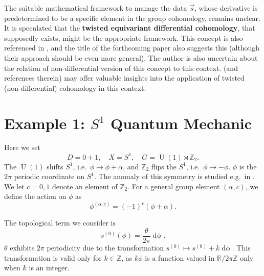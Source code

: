 \documentclass[
  letterpaper,
  DIV=11,
  numbers=noendperiod]{scrreport}
\DeclareMathOperator{\U}{U}
\begin{document}
\begin{tcolorbox}[enhanced jigsaw, opacityback=0, opacitybacktitle=0.6, leftrule=.75mm, arc=.35mm, coltitle=black, breakable, colframe=quarto-callout-note-color-frame, titlerule=0mm, colback=white, bottomrule=.15mm, left=2mm, colbacktitle=quarto-callout-note-color!10!white, toptitle=1mm, bottomtitle=1mm, title=\textcolor{quarto-callout-note-color}{\faInfo}\hspace{0.5em}{Twisted Equivariant Cohomology?}, rightrule=.15mm, toprule=.15mm]

The suitable mathematical framework to manage the data \(\vec{s}\),
whose derivative is predetermined to be a specific element in the group
cohomology, remains unclear. It is speculated that the \textbf{twisted
equivariant differential cohomology}, that supposedly exists, might be
the appropriate framework. This concept is also referenced in
\autocite{SatiSlides}, and the title of the forthcoming paper
\autocite{SatiSchreiberTED} also suggests this (although their approach
should be even more general). The author is also uncertain about the
relation of non-differential version of this concept to this context.
\autocite{Rosenberg:2024dmx} (and references therein) may offer valuable
insights into the application of twisted (non-differential) cohomology
in this context.

\end{tcolorbox}

\section{\texorpdfstring{Example 1: \(S^1\) Quantum
Mechanic}{Example 1: S\^{}1 Quantum Mechanic}}\label{sec-equivariant-example-QM}

Here we set \[
D=0+1, \quad X = S^1, \quad G = \U(1)\rtimes \mathbb{Z}_2.
\] The \(\U(1)\) shifts \(S^1\), i.e.~\(\phi\mapsto \phi+\alpha\), and
\(\mathbb{Z}_2\) flips the \(S^1\), i.e.~\(\phi\mapsto -\phi\). \(\phi\)
is the \(2\pi\) periodic coordinate on \(S^1\). The anomaly of this
symmetry is studied e.g.~in \autocite[Appendix D.1]{Gaiotto:2017yup}. We
let \(c=0,1\) denote an element of \(\mathbb{Z}_2\). For a general group
element \((\alpha,c)\), we define the action on \(\phi\) as \[
 \phi^{(\alpha,c)} = (-1)^c(\phi+\alpha).
 \]

The topological term we consider is \[
s^{(0)}(\phi) = \frac{\theta}{2\pi} \mathop{d\phi}.
\] \(\theta\) exhibits \(2\pi\) periodicity due to the transformation
\(s^{(0)} \mapsto s^{(0)} + k\mathop{d\phi}\). This transformation is
valid only for \(k\in \mathbb{Z}\), as \(k \phi\) is a function valued
in \(\mathbb{R}/2\pi\mathbb{Z}\) only when \(k\) is an integer.
\end{document}
